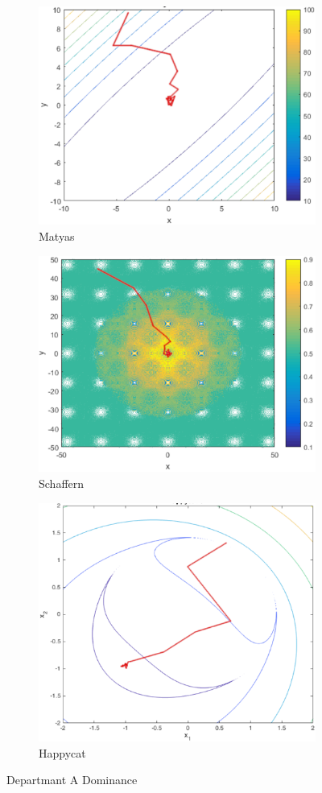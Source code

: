 \documentclass[conference]{IEEEtran}
\begin{document}
\begin{figure}[htp]
\begin{subfigure}{.275\textwidth}
  \centering
  \includegraphics[width=.6\linewidth]{matyas.png}
  \caption{Matyas}
  \label{fig:figur:4}
\end{subfigure}
\begin{subfigure}{.275\textwidth}
  \centering
  \includegraphics[width=.6\linewidth]{schaffern.png}
  \caption{Schaffern}
  \label{fig:figur:5}
\end{subfigure}%
\begin{subfigure}{.275\textwidth}
  \centering
  \includegraphics[width=.6\linewidth]{happycat.png}
  \caption{Happycat}
  \label{fig:figur:6}
\end{subfigure}
\caption{Departmant A Dominance}
\end{figure}
\end{document}
